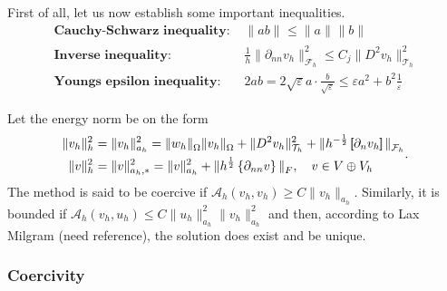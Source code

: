 First of all, let us now establish some important inequalities.
\[
\begin{split}
    \textbf{Cauchy-Schwarz inequality: } & \| ab \|_{  }^{  }  \le \| a \|_{  }^{  } \| b \|_{  }^{  }   \\
    \textbf{Inverse inequality: } & \frac{1}{h}\| \partial _{nn}  v_{h} \|_{\mathcal{F}_{h}   }^{2  }  \le C_{j} \| D ^2 v_{h} \|_{ \mathcal{T} _{h} }^{ 2 }   \\
    \textbf{Youngs epsilon inequality: } & 2ab =   2\sqrt{\varepsilon }a\cdot    \frac{b}{\sqrt{\varepsilon } } \le \varepsilon a^2+ b^2 \frac{1}{\varepsilon }
\end{split}
\]

Let the energy norm be on the form
\begin{equation}
\label{eq:A_energy_norm}
    \begin{split}
\| v_{h} \|_{ h }^{2  } & = \| v_{h} \|_{ a_{h} }^{ 2 } =  \|  w_{h} \|_{ \Omega  }^{  }\| v_{h} \|_{ \Omega  }^{  }  +  \| D ^2 v_{h} \|_{ \mathcal{T} _{h}  }^{ 2 }  + \|  h^{-\frac{1}{2}} \left[\!\!\left[  \partial _{n} v_{h}     \right]\!\!\right]\|_{  \mathcal{F} _{h} }^{  } \\
\| v \|_{ h }^{ 2 }  &= \| v \|_{ a_{h},* }^{ 2 } = \| v \|_{ a_{h} }^{ 2 }  + \| h^{\frac{1}{2}} \left\{ \partial _{nn } v\right\}  \|_{ F  }^{  }, \quad  v\in V \oplus V_{h}
    \end{split}
.\end{equation}
The method is said to be coercive if $\mathcal{A} _{h}\left( v_{h}, v_{h} \right) \ge  C \| v_{h} \|_{ a_{h} }^{  } $. Similarly, it is bounded if $ \mathcal{A} _{h} \left( v_{h}, u_{h} \right) \le  C \| u_{h} \|_{  a_{h}}^{ 2 }  \| v_{h} \|_{ a_{h}
}^{ 2 } $ and then, according to Lax Milgram (need reference), the solution does exist and be unique.

\subsubsection{Coercivity}%
\label{ssub:coercitivity}


